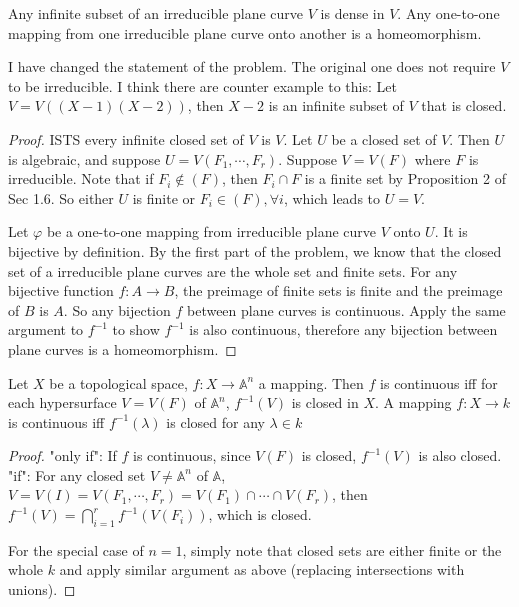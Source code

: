 \documentclass{solution}
\begin{document}
\begin{problem}{6.5}
    Any infinite subset of an irreducible plane curve $V$ is dense in $V$. Any one-to-one mapping from one irreducible plane curve onto another is a homeomorphism.
\end{problem}

\begin{remark}
    I have changed the statement of the problem. The original one does not require $V$ to be irreducible. I think there are counter example to this: Let $V = V((X - 1)(X - 2))$, then $X - 2$ is an infinite subset of $V$ that is closed.
\end{remark}

\begin{proof}
    ISTS every infinite closed set of $V$ is $V$. Let $U$ be a closed set of $V$. Then $U$ is algebraic, and suppose $U = V(F_1, \cdots, F_r)$. Suppose $V = V(F)$ where $F$ is irreducible. Note that if $F_i \notin (F)$, then $F_i \cap F$ is a finite set by Proposition 2 of Sec 1.6. So either $U$ is finite or $F_i \in (F), \forall i$, which leads to $U = V$.

    Let $\varphi$ be a one-to-one mapping from irreducible plane curve $V$ onto $U$. It is bijective by definition. By the first part of the problem, we know that the closed set of a irreducible plane curves are the whole set and finite sets. For any bijective function $f: A \rightarrow B$, the preimage of finite sets is finite and the preimage of $B$ is $A$. So any bijection $f$ between plane curves is continuous. Apply the same argument to $f ^{-1}$ to show $f ^{-1}$ is also continuous, therefore any bijection between plane curves is a homeomorphism.
\end{proof}

\begin{problem}{6.6}
    Let $X$ be a topological space, $f: X \rightarrow \mathbb{A}^n$ a mapping. Then $f$ is continuous iff for each hypersurface $V = V(F)$ of $\mathbb{A}^n$, $f ^{-1}(V)$ is closed in $X$. A mapping $f: X \rightarrow k$ is continuous iff $f ^{-1}(\lambda)$ is closed for any $\lambda \in k$
\end{problem}

\begin{proof}
    "only if": If $f$ is continuous, since $V(F)$ is closed, $f ^{-1} (V)$ is also closed. "if": For any closed set $V \ne \mathbb{A}^n$ of $\mathbb{A}$, $V = V(I) = V(F_1, \cdots, F_r) = V(F_1) \cap \cdots \cap V(F_r)$, then $f ^{-1}(V) = \bigcap\limits_{i = 1}^{r} f ^{-1} (V(F_i))$, which is closed.

    For the special case of $n = 1$, simply note that closed sets are either finite or the whole $k$ and apply similar argument as above (replacing intersections with unions).
\end{proof}
\end{document}
